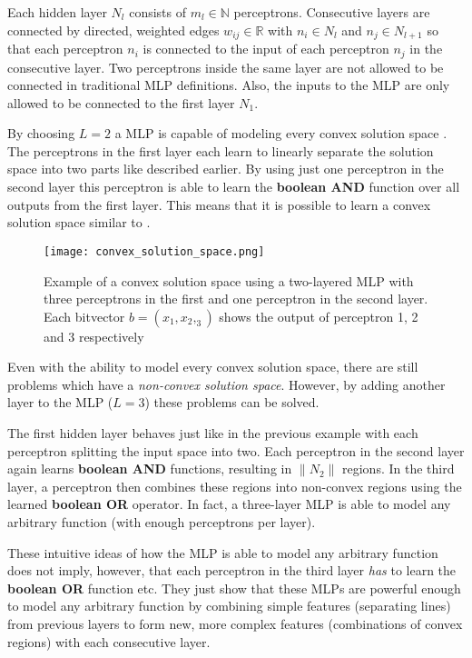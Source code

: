 Each hidden layer $N_l$ consists of $m_l \in \mathbb{N}$ perceptrons.
Consecutive layers are connected by directed, weighted edges $w_{ij} \in \mathbb{R}$ with $n_i \in N_l$ and $n_j \in N_{l+1}$ so that each perceptron $n_i$ is connected to the input of each perceptron $n_j$ in the consecutive layer.
Two perceptrons inside the same layer are not allowed to be connected in traditional MLP definitions.
Also, the inputs to the MLP are only allowed to be connected to the first layer $N_1$.


By choosing $L=2$ a MLP is capable of modeling every convex solution space \cite{rojas_neural_1996}.
The perceptrons in the first layer each learn to linearly separate the solution space into two parts like described earlier.
By using just one perceptron in the second layer this perceptron is able to learn the \textbf{boolean AND} function over all outputs from the first layer.
This means that it is possible to learn a convex solution space similar to .

\begin{figure}[htb!]
    \centering
    \texttt{[image: convex\_solution\_space.png]}
    \caption{Example of a convex solution space using a two-layered MLP with three perceptrons in the first and one perceptron in the second layer. Each bitvector $b = (x_1, x_2, _3)$ shows the output of perceptron 1, 2 and 3 respectively \cite{rojas_neural_1996}}
    \label{fig:convex-solution}
\end{figure}

Even with the ability to model every convex solution space, there are still problems which have a \textit{non-convex solution space}.
However, by adding another layer to the MLP ($L=3$) these problems can be solved.

The first hidden layer behaves just like in the previous example with each perceptron splitting the input space into two.
Each perceptron in the second layer again learns \textbf{boolean AND} functions, resulting in $\lVert N_2 \rVert$ regions.
In the third layer, a perceptron then combines these regions into non-convex regions using the learned \textbf{boolean OR} operator.
In fact, a three-layer MLP is able to model any arbitrary function (with enough perceptrons per layer).

These intuitive ideas of how the MLP is able to model any arbitrary function does not imply, however, that each perceptron in the third layer \textit{has} to learn the \textbf{boolean OR} function etc.
They just show that these MLPs are powerful enough to model any arbitrary function by combining simple features (separating lines) from previous layers to form new, more complex features (combinations of convex regions) with each consecutive layer.

